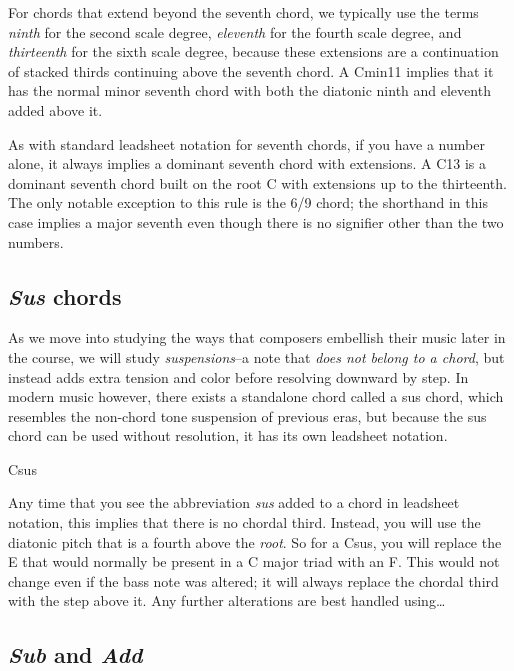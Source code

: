 \documentclass{book}
\begin{document}
For chords that extend beyond the seventh chord, we typically use the terms
\emph{ninth} for the second scale degree, \emph{eleventh} for the fourth scale
degree, and \emph{thirteenth} for the sixth scale degree, because these
extensions are a continuation of stacked thirds continuing above the seventh
chord. A Cmin11 implies that it has the normal minor seventh chord with both
the diatonic ninth and eleventh added above it.

As with standard leadsheet notation for seventh chords, if you have a number
alone, it always implies a dominant seventh chord with extensions. A C13 is a
dominant seventh chord built on the root C with extensions up to the
thirteenth. The only notable exception to this rule is the 6/9 chord; the
shorthand in this case implies a major seventh even though there is no
signifier other than the two numbers.

\hypertarget{sus-chords}{%
\subsection{\texorpdfstring{\emph{Sus} chords}{Sus chords}}\label{sus-chords}}

As we move into studying the ways that composers embellish their music later
in the course, we will study \emph{suspensions}--a note that \emph{does not
belong to a chord}, but instead adds extra tension and color before resolving
downward by step. In modern music however, there exists a standalone chord
called a sus chord, which resembles the non-chord tone suspension of previous
eras, but because the sus chord can be used without resolution, it has its own
leadsheet notation.

Csus

Any time that you see the abbreviation \emph{sus} added to a chord in
leadsheet notation, this implies that there is no chordal third. Instead, you
will use the diatonic pitch that is a fourth above the \emph{root}. So for a
Csus, you will replace the E that would normally be present in a C major triad
with an F. This would not change even if the bass note was altered; it will
always replace the chordal third with the step above it. Any further
alterations are best handled using\ldots{}

\hypertarget{sub-and-add}{%
\subsection{\texorpdfstring{\emph{Sub} and
\emph{Add}}{Sub and Add}}\label{sub-and-add}}
\end{document}
